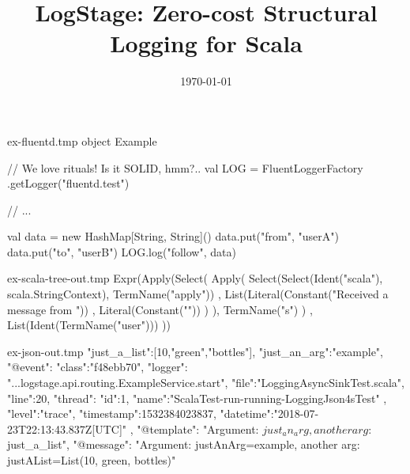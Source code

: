 \documentclass[usenames,dvipsnames]{beamer}
\title[LogStage]{LogStage: Zero-cost Structural Logging for Scala}
\institute[Septimal Mind Ltd]
    {
    Septimal Mind Ltd\\
    \medskip
    \textit{team@7mind.io}
    }
\date{\today}
\begin{document}
\begin{VerbatimOut}{ex-fluentd.tmp}
object Example {
  // We love rituals! Is it SOLID, hmm?..
  val LOG = FluentLoggerFactory
    .getLogger("fluentd.test")

  // ...

  val data =
      new HashMap[String, String]()
  data.put("from", "userA")
  data.put("to", "userB")
  LOG.log("follow", data)
}
\end{VerbatimOut}



\begin{VerbatimOut}{ex-scala-tree-out.tmp}
Expr(Apply(Select(
  Apply(
    Select(Select(Ident("scala"), scala.StringContext),
      TermName("apply"))
      , List(Literal(Constant("Received a message from "))
          , Literal(Constant(""))
        )
  ),
  TermName("s")
  )
, List(Ident(TermName("user")))
))
\end{VerbatimOut}

\begin{VerbatimOut}{ex-json-out.tmp}
{
"just_a_list":[10,"green","bottles"],
"just_an_arg":"example",
"@event":{
  "class":"f48ebb70",
  "logger": "...logstage.api.routing.ExampleService.start",
  "file":"LoggingAsyncSinkTest.scala", "line":20,
  "thread":{ "id":1, "name":"ScalaTest-run-running-LoggingJson4sTest" },
  "level":"trace",
  "timestamp":1532384023837,
  "datetime":"2018-07-23T22:13:43.837Z[UTC]"
},
"@template":
"Argument: ${just_an_arg}, another arg: ${just_a_list}",
"@message":
"Argument: justAnArg=example, another arg: justAList=List(10, green, bottles)"
}
\end{VerbatimOut}

\end{document}
